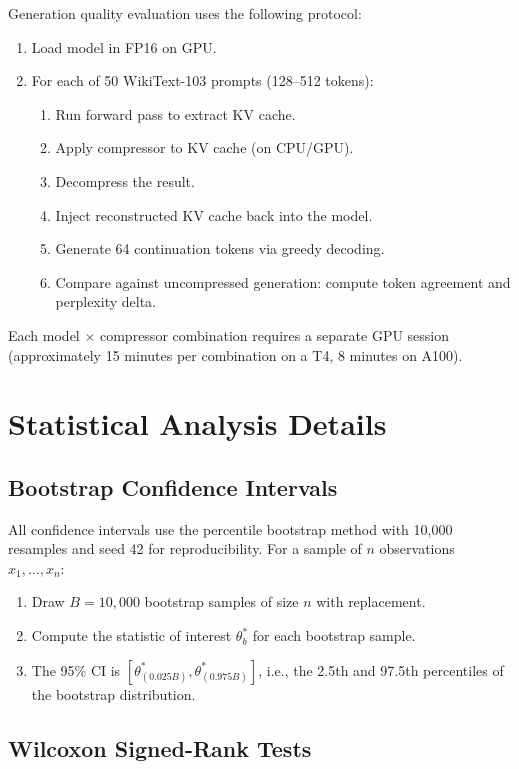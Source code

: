 \documentclass{article}
\begin{document}
Generation quality evaluation uses the following protocol:
\begin{enumerate}    \item Load model in FP16 on GPU.
    \item For each of 50 WikiText-103 prompts (128--512 tokens):
    \begin{enumerate}
        \item Run forward pass to extract KV cache.
        \item Apply compressor to KV cache (on CPU/GPU).
        \item Decompress the result.
        \item Inject reconstructed KV cache back into the model.
        \item Generate 64 continuation tokens via greedy decoding.
        \item Compare against uncompressed generation: compute token agreement and perplexity delta.
    \end{enumerate}
\end{enumerate}

Each model $\times$ compressor combination requires a separate GPU session (approximately 15 minutes per combination on a T4, 8 minutes on A100).

\section{Statistical Analysis Details}
\label{app:statistics}

\subsection{Bootstrap Confidence Intervals}

All confidence intervals use the percentile bootstrap method with 10{,}000 resamples and seed 42 for reproducibility. For a sample of $n$ observations $x_1, \ldots, x_n$:
\begin{enumerate}    \item Draw $B = 10{,}000$ bootstrap samples of size $n$ with replacement.
    \item Compute the statistic of interest $\theta^*_b$ for each bootstrap sample.
    \item The 95\% CI is $[\theta^*_{(0.025B)}, \theta^*_{(0.975B)}]$, i.e., the 2.5th and 97.5th percentiles of the bootstrap distribution.
\end{enumerate}

\subsection{Wilcoxon Signed-Rank Tests}
\end{document}
